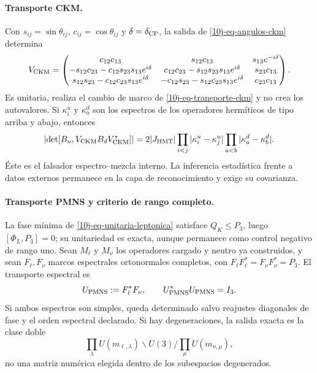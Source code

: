 \paragraph{Transporte CKM.}
Con \(s_{ij}=\sin\theta_{ij}\), \(c_{ij}=\cos\theta_{ij}\) y
\(\delta=\delta_{\rm CP}\), la salida de \eqref{10j-eq-angulos-ckm} determina
\begin{equation}
 V_{\rm CKM}=\begin{pmatrix}
 c_{12}c_{13}&s_{12}c_{13}&s_{13}e^{-i\delta}\\
 -s_{12}c_{23}-c_{12}s_{23}s_{13}e^{i\delta}&
 c_{12}c_{23}-s_{12}s_{23}s_{13}e^{i\delta}&s_{23}c_{13}\\
 s_{12}s_{23}-c_{12}c_{23}s_{13}e^{i\delta}&
 -c_{12}s_{23}-s_{12}c_{23}s_{13}e^{i\delta}&c_{23}c_{13}
 \end{pmatrix}.
 \label{10j-eq-vckm-explicita}
\end{equation}
Es unitaria, realiza el cambio de marco de
\eqref{10j-eq-transporte-ckm} y no crea los autovalores. Si
\(\kappa_i^u\) y \(\kappa_a^d\) son los espectros de los operadores
hermíticos de tipo arriba y abajo, entonces
\begin{equation}
 \left|\det[B_u,V_{\rm CKM}B_dV_{\rm CKM}^*]\right|
 =2|J_{\rm HMT}|
 \prod_{i<j}|\kappa_i^u-\kappa_j^u|
 \prod_{a<b}|\kappa_a^d-\kappa_b^d|.
 \label{10j-eq-determinante-conmutador-ckm}
\end{equation}
Éste es el falsador espectro--mezcla interno. La inferencia estadística frente
a datos externos permanece en la capa de reconocimiento y exige su covarianza.

\paragraph{Transporte PMNS y criterio de rango completo.}
La fase mínima de \eqref{10j-eq-unitaria-leptonica} satisface
\(Q_K\leq P_3\), luego \([\Phi_L,P_3]=0\); su unitariedad es exacta, aunque
permanece como control negativo de rango uno. Sean \(M_\ell\) y \(M_\nu\) los
operadores cargado y neutro ya construidos, y sean \(F_\ell,F_\nu\) marcos
espectrales ortonormales completos, con
\(F_\ell F_\ell^*=F_\nu F_\nu^*=P_3\). El transporte espectral es
\begin{equation}
 U_{\rm PMNS}:=F_\ell^*F_\nu,
 \qquad U_{\rm PMNS}^*U_{\rm PMNS}=I_3.
 \label{10j-eq-pmns-marcos-espectrales}
\end{equation}
Si ambos espectros son simples, queda determinado salvo reajustes diagonales
de fase y el orden espectral declarado. Si hay degeneraciones, la salida
exacta es la clase doble
\begin{equation}
 \prod_\lambda U(m_{\ell,\lambda})\backslash U(3)/
 \prod_\mu U(m_{\nu,\mu}),
 \label{10j-eq-pmns-clase-doble}
\end{equation}
no una matriz numérica elegida dentro de los subespacios degenerados.

